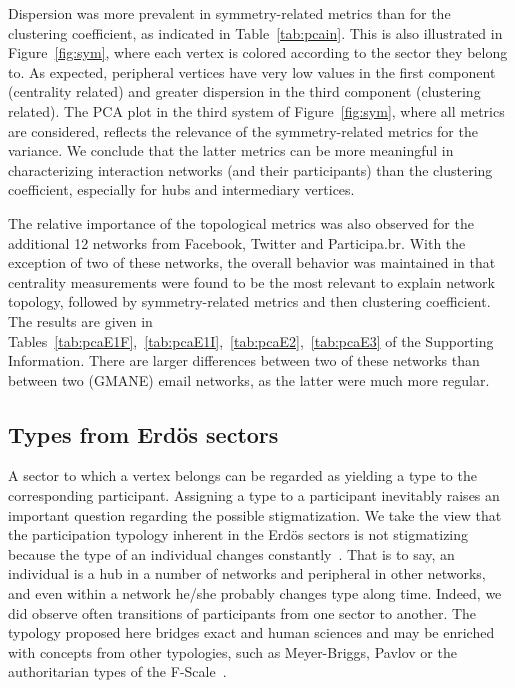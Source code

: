 \documentclass[%
	aip,
	jmp,%
	amsmath,amssymb,
	reprint,%
]{revtex4-1}
\begin{document}
Dispersion was more prevalent in symmetry-related metrics than for the clustering coefficient, as indicated in Table~\ref{tab:pcain}. This is also illustrated in Figure~\ref{fig:sym}, where each vertex is colored according to the sector they belong to. As expected, peripheral vertices have very low values in the first component (centrality related) and greater dispersion in the third component (clustering related).
The PCA plot in the third system of Figure~\ref{fig:sym}, where all metrics are considered, reflects the relevance of the symmetry-related metrics for the variance.
We conclude that the latter metrics can be more meaningful in characterizing interaction networks (and their participants) than the clustering coefficient, especially for hubs and intermediary vertices.

The relative importance of the topological metrics was also observed for the additional 12 networks from Facebook, Twitter and Participa.br. With the exception of two of these networks, the overall behavior was maintained in that centrality measurements were found to be the most relevant to explain network topology, followed by symmetry-related metrics and then clustering coefficient. The results are given in Tables~\ref{tab:pcaE1F},~\ref{tab:pcaE1I},~\ref{tab:pcaE2},~\ref{tab:pcaE3} of the Supporting Information. There are larger differences between two of these networks than between two (GMANE) email networks, as the latter were much more regular.

\subsection{Types from Erd\"os sectors}\label{sec:pty}
A sector to which a vertex belongs can be regarded as yielding a type to the corresponding participant.
Assigning a type to a participant inevitably raises an important question regarding the possible stigmatization. 
We take the view that the participation typology inherent in the Erd\"os sectors is not stigmatizing because the type of an individual changes constantly~\cite{adorno}. 
That is to say, an individual is a hub in a number of networks and peripheral in other networks, and even within a network he/she probably changes type along time. 
Indeed, we did observe often transitions of participants from one sector to another.
The typology proposed here bridges exact and human sciences and may be enriched with concepts from other typologies, such as Meyer-Briggs, Pavlov or the authoritarian types of the F-Scale~\cite{adorno}.
\end{document}
